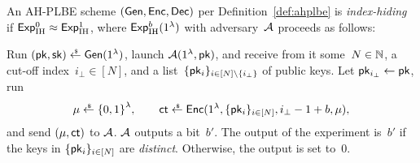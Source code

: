 \begin{definition}\label{def:ahplbe-index-hiding}
An AH-PLBE scheme $({\smash{\mathsf{Gen}}},{\smash{\mathsf{Enc}}},{\smash{\mathsf{Dec}}})$ per Definition~\ref{def:ahplbe}
is \emph{index-hiding} if ${{\smash{\mathsf{Exp}}_{\textup{IH}}^{0}}\approx{\smash{\mathsf{Exp}}_{\textup{IH}}^{1}}}$,
where ${\smash{\mathsf{Exp}}_{\textup{IH}}^{b}}(1^\lambda)$ with adversary~${\mathcal{A}}$ proceeds as follows:
\begin{security}
Run
${(\pk,\sk)\draws\Gen(1^\lambda)}$,
launch ${\mathcal{A}}(1^\lambda,{\smash{\mathsf{pk}}})$, and
receive from it
some~${N\in{\mathbb{N}}}$,
a cut-off index~${i_\bot\in[N]}$, and
a list~$\{\pk_i\}_{i\in[N]\setminus\{i_\bot\}}$ of public keys.
Let ${\pk_{i_\bot}\gets\pk}$,
run
\begin{align*}
\mu\draws\bit^\lambda,\qquad
\ct\draws\Enc(1^\lambda,\{\pk_i\}_{i\in[N]},i_\bot-1+b,\mu),
\end{align*}
and send $(\mu,{\smash{\mathsf{ct}}})$ to ${\mathcal{A}}$.
${\mathcal{A}}$ outputs a bit~$b'$.
The output of the experiment is~$b'$ if
the keys in $\{{\smash{\mathsf{pk}}}_i\}_{i\in[N]}$ are \emph{distinct}.
Otherwise, the output is set to~$0$.
\end{security}
\end{definition}
